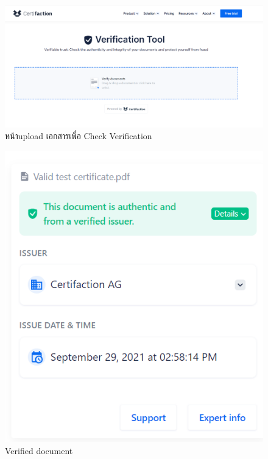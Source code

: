 \enskip \enskip \enskip 
\graphicspath{ {./images/} }
\begin{figure}[htbp]
  \centering 
  \includegraphics[scale=0.3]{6.png}
  \caption[หน้าupload เอกสารเพื่อ Check Verification]{หน้าupload เอกสารเพื่อ Check Verification}
  \label{4}
\end{figure}


\enskip \enskip \enskip 
\graphicspath{ {./images/} }
\begin{figure}[htbp]
  \centering 
  \includegraphics[scale=0.3]{5.png}
  \caption[Verified document]{Verified document}
  \label{5}
\end{figure}


